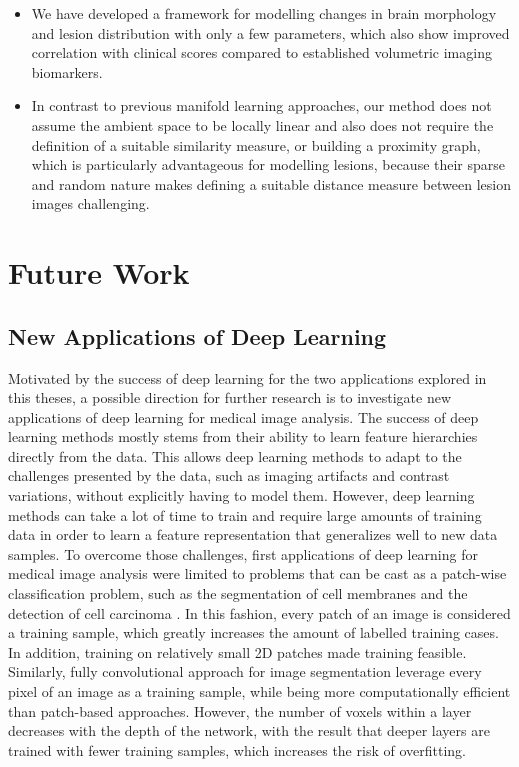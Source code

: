 \begin{itemize}
\item We have developed a framework for modelling changes in brain morphology
and lesion distribution with only a few parameters, which also show improved
correlation with clinical scores compared to established volumetric imaging
biomarkers.

\item In contrast to previous manifold learning approaches, our method does not
assume the ambient space to be locally linear and also does not require the
definition of a suitable similarity measure, or building a proximity graph,
which is particularly advantageous for modelling lesions, because their sparse
and random nature makes defining a suitable distance measure between lesion
images challenging.
\end{itemize}

\section[Future work]{Future Work}

\subsection[New applications of deep learning]{New Applications of Deep
Learning}

Motivated by the success of deep learning for the two applications explored in
this theses, a possible direction for further research is to investigate new
applications of deep learning for medical image analysis. The success of deep
learning methods mostly stems from their ability to learn feature hierarchies
directly from the data. This allows deep learning methods to adapt to the
challenges presented by the data, such as imaging artifacts and contrast
variations, without explicitly having to model them. However, deep learning
methods can take a lot of time to train and require large amounts of training
data in order to learn a feature representation that generalizes well to new
data samples. To overcome those challenges, first applications of deep learning
for medical image analysis were limited to problems that can be cast as a
patch-wise classification problem, such as the segmentation of cell membranes
\citep{ciresan2012} and the detection of cell carcinoma \citep{cruz2013}. In
this fashion, every patch of an image is considered a training sample, which
greatly increases the amount of labelled training cases.
In addition, training on relatively small 2D patches made training feasible.
Similarly, fully convolutional approach for image segmentation leverage every
pixel of an image as a training sample, while being more computationally
efficient than patch-based approaches. However, the number of voxels within a
layer decreases with the depth of the network, with the result that deeper
layers are trained with fewer training samples, which increases the risk of
overfitting.

